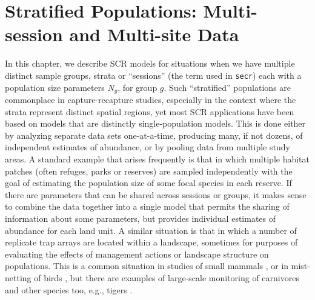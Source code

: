 \chapter{Stratified Populations:
Multi-session and Multi-site Data}
\label{chapt.hscr}

\vspace{0.3cm}


In this chapter, we describe SCR models for situations when we have
multiple distinct sample groups, strata or ``sessions'' (the term used
in \mbox{\tt secr}) each with a population size parameters $N_{g}$, for
group $g$.
Such ``stratified'' populations are commonplace in capture-recapture
studies, especially in the context where the strata represent
distinct spatial regions, yet most SCR applications have been based
 on models that are distinctly single-population models. This is done
 either by analyzing separate data sets one-at-a-time, producing many,
 if not dozens, of independent estimates of abundance, or by pooling
 data from multiple study areas.  A standard example that arises
frequently is that in which multiple habitat patches (often refuges,
parks or reserves) are sampled independently with the goal of
estimating the population size of some focal species in each
reserve. If there are parameters that can be shared across sessions or
groups, it makes sense to 
combine the data together into a single model that permits the
sharing of information about some parameters, but provides individual
estimates of abundance for each land unit.  
A similar situation is that in which a number of replicate trap arrays
are located within a landscape, sometimes for purposes of evaluating
the effects of management actions or landscape structure on
populations. This is a common situation in studies of small mammals
\citep{converse_etal:2006jwm, converse_etal:2006ea,
  converse_royle:2012}, or in mist-netting of birds
\citep{desante_etal:1995}, but there are examples of large-scale
monitoring of carnivores and other species too, e.g., tigers
\citep{jhala_etal:2011}.

